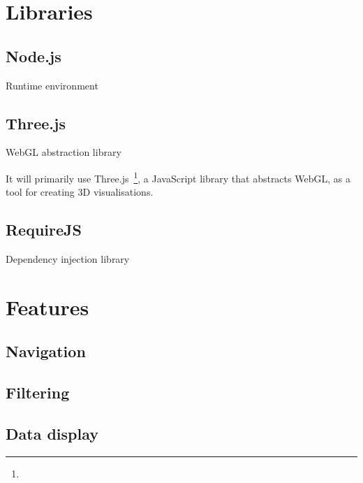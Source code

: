 \section{Libraries} {
	
	\subsection{Node.js} {
	
		Runtime environment

	}

	\subsection{Three.js} {
		
		WebGL abstraction library

		It will primarily use Three.js~\footnote{}, a JavaScript library that abstracts WebGL, as a tool for creating 3D visualisations. 

	}

	\subsection{RequireJS} {
		
		Dependency injection library

	}

}

\section{Features} {
	
	\subsection{Navigation} {


	}

	\subsection{Filtering} {

	}

	\subsection{Data display} {



	}

}
